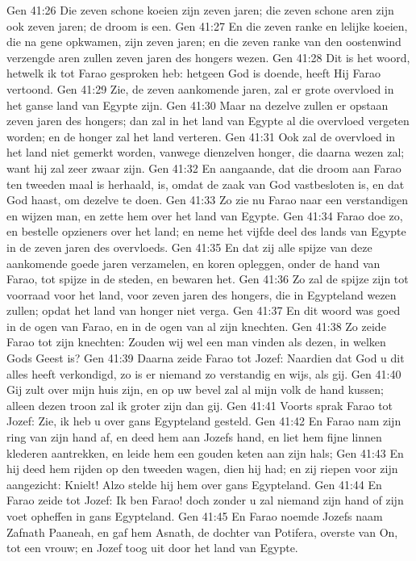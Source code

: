 Gen 41:26  Die zeven schone koeien zijn zeven jaren; die zeven schone aren zijn ook zeven jaren; de droom is een.
Gen 41:27  En die zeven ranke en lelijke koeien, die na gene opkwamen, zijn zeven jaren; en die zeven ranke van den oostenwind verzengde aren zullen zeven jaren des hongers wezen.
Gen 41:28  Dit is het woord, hetwelk ik tot Farao gesproken heb: hetgeen God is doende, heeft Hij Farao vertoond.
Gen 41:29  Zie, de zeven aankomende jaren, zal er grote overvloed in het ganse land van Egypte zijn.
Gen 41:30  Maar na dezelve zullen er opstaan zeven jaren des hongers; dan zal in het land van Egypte al die overvloed vergeten worden; en de honger zal het land verteren.
Gen 41:31  Ook zal de overvloed in het land niet gemerkt worden, vanwege dienzelven honger, die daarna wezen zal; want hij zal zeer zwaar zijn.
Gen 41:32  En aangaande, dat die droom aan Farao ten tweeden maal is herhaald, is, omdat de zaak van God vastbesloten is, en dat God haast, om dezelve te doen.
Gen 41:33  Zo zie nu Farao naar een verstandigen en wijzen man, en zette hem over het land van Egypte.
Gen 41:34  Farao doe zo, en bestelle opzieners over het land; en neme het vijfde deel des lands van Egypte in de zeven jaren des overvloeds.
Gen 41:35  En dat zij alle spijze van deze aankomende goede jaren verzamelen, en koren opleggen, onder de hand van Farao, tot spijze in de steden, en bewaren het.
Gen 41:36  Zo zal de spijze zijn tot voorraad voor het land, voor zeven jaren des hongers, die in Egypteland wezen zullen; opdat het land van honger niet verga.
Gen 41:37  En dit woord was goed in de ogen van Farao, en in de ogen van al zijn knechten.
Gen 41:38  Zo zeide Farao tot zijn knechten: Zouden wij wel een man vinden als dezen, in welken Gods Geest is?
Gen 41:39  Daarna zeide Farao tot Jozef: Naardien dat God u dit alles heeft verkondigd, zo is er niemand zo verstandig en wijs, als gij.
Gen 41:40  Gij zult over mijn huis zijn, en op uw bevel zal al mijn volk de hand kussen; alleen dezen troon zal ik groter zijn dan gij.
Gen 41:41  Voorts sprak Farao tot Jozef: Zie, ik heb u over gans Egypteland gesteld.
Gen 41:42  En Farao nam zijn ring van zijn hand af, en deed hem aan Jozefs hand, en liet hem fijne linnen klederen aantrekken, en leide hem een gouden keten aan zijn hals;
Gen 41:43  En hij deed hem rijden op den tweeden wagen, dien hij had; en zij riepen voor zijn aangezicht: Knielt! Alzo stelde hij hem over gans Egypteland.
Gen 41:44  En Farao zeide tot Jozef: Ik ben Farao! doch zonder u zal niemand zijn hand of zijn voet opheffen in gans Egypteland.
Gen 41:45  En Farao noemde Jozefs naam Zafnath Paaneah, en gaf hem Asnath, de dochter van Potifera, overste van On, tot een vrouw; en Jozef toog uit door het land van Egypte.
